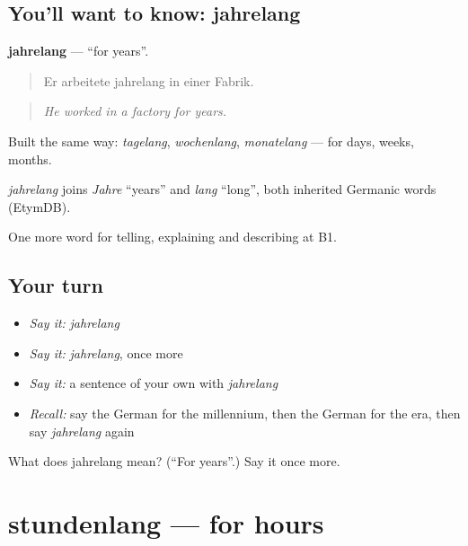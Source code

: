 \subsection*{You'll want to know: jahrelang}
\textbf{jahrelang} — \textquotedblleft{}for years\textquotedblright{}.

\begin{quote}
Er arbeitete jahrelang in einer Fabrik.
\end{quote}

\begin{quote}
\emph{He worked in a factory for years.}
\end{quote}

Built the same way: \emph{tagelang}, \emph{wochenlang}, \emph{monatelang} — for days, weeks, months.

\begin{cousinweb}
\emph{jahrelang} joins \emph{Jahre} \textquotedblleft{}years\textquotedblright{} and \emph{lang} \textquotedblleft{}long\textquotedblright{}, both inherited Germanic words (EtymDB).
\end{cousinweb}

\begin{grammarlens}[title={What you've built}]
One more word for telling, explaining and describing at B1.
\end{grammarlens}

\subsection*{Your turn}
\begin{itemize}
\raggedright
  \item \emph{Say it:} \emph{jahrelang}
  \item \emph{Say it:} \emph{jahrelang}, once more
  \item \emph{Say it:} a sentence of your own with \emph{jahrelang}
  \item \emph{Recall:} say the German for the millennium, then the German for the era, then say \emph{jahrelang} again
\end{itemize}

\begin{tcolorbox}[breakable,colback=teal!4,colframe=teal!35!black,title={Before you move on}]
What does jahrelang mean? (\textquotedblleft{}For years\textquotedblright{}.) Say it once more.
\end{tcolorbox}
\section[stundenlang]{stundenlang — for hours}


